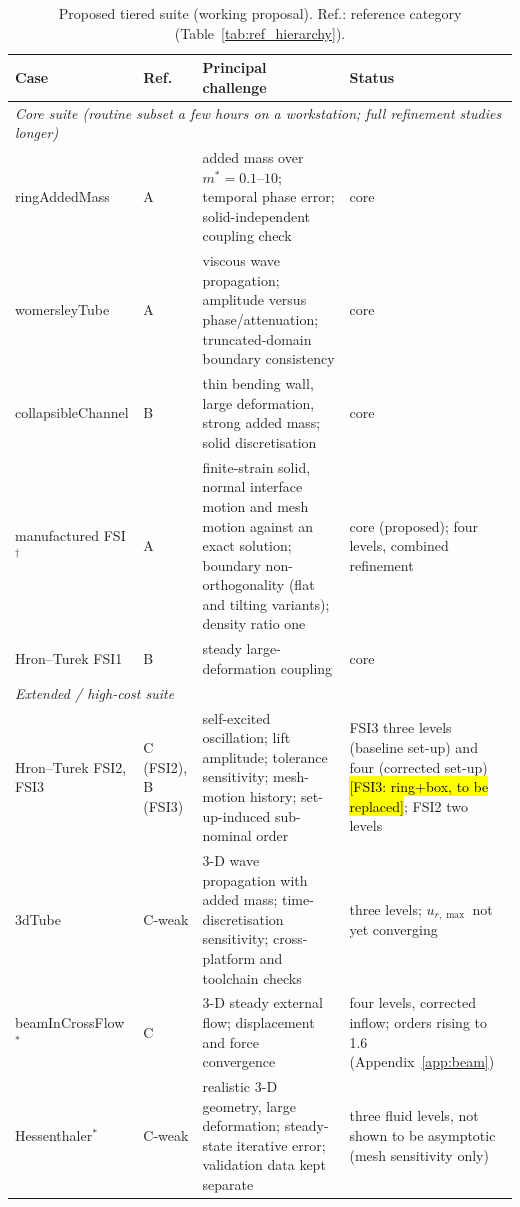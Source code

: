 \begin{table}[htbp]
	\centering
	\footnotesize
	\setlength{\tabcolsep}{3pt}
	\caption{Proposed tiered suite (working proposal). Ref.: reference category (Table~\ref{tab:ref_hierarchy}).}
	\label{tab:suite_tiers}
	\begin{tabular}{p{2.8cm}p{1.1cm}p{6.3cm}p{3.4cm}}
		\toprule
		Case & Ref. & Principal challenge & Status \\
		\midrule
		\multicolumn{4}{l}{\emph{Core suite (routine subset a few hours on a workstation; full refinement studies longer)}} \\
		ringAddedMass & A & added mass over $m^* = 0.1$--$10$; temporal phase error; solid-independent coupling check & core \\
		womersleyTube & A & viscous wave propagation; amplitude versus phase/attenuation; truncated-domain boundary consistency & core \\
		collapsibleChannel & B & thin bending wall, large deformation, strong added mass; solid discretisation & core \\
		manufactured FSI$^\dagger$ & A & finite-strain solid, normal interface motion and mesh motion against an exact solution; boundary non-orthogonality (flat and tilting variants); density ratio one & core (proposed); four levels, combined refinement \\
		Hron--Turek FSI1 & B & steady large-deformation coupling & core \\
		\midrule
		\multicolumn{4}{l}{\emph{Extended / high-cost suite}} \\
		Hron--Turek FSI2, FSI3 & C (FSI2), B (FSI3) & self-excited oscillation; lift amplitude; tolerance sensitivity; mesh-motion history; set-up-induced sub-nominal order & FSI3 three levels (baseline set-up) and four (corrected set-up) \hl{[FSI3: ring+box, to be replaced]}; FSI2 two levels \\
		3dTube & C-weak & 3-D wave propagation with added mass; time-discretisation sensitivity; cross-platform and toolchain checks & three levels; $u_{r,\max}$ not yet converging \\
		beamInCrossFlow$^\ast$ & C & 3-D steady external flow; displacement and force convergence & four levels, corrected inflow; orders rising to 1.6 (Appendix~\ref{app:beam}) \\
		Hessenthaler$^\ast$ & C-weak & realistic 3-D geometry, large deformation; steady-state iterative error; validation data kept separate & three fluid levels, not shown to be asymptotic (mesh sensitivity only) \\

\end{tabular}
\end{table}
